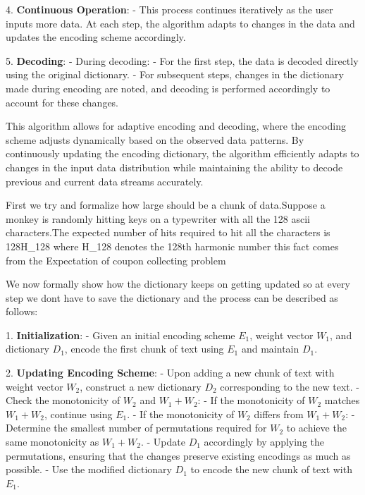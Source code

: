 \documentclass[scrartcl]{article}
\begin{document}
   4. \textbf{Continuous Operation}:
      - This process continues iteratively as the user inputs more data. At each step, the algorithm adapts to changes in the data and updates the encoding scheme accordingly.
   
   5. \textbf{Decoding}:
      - During decoding:
        - For the first step, the data is decoded directly using the original dictionary.
        - For subsequent steps, changes in the dictionary made during encoding are noted, and decoding is performed accordingly to account for these changes.
   
   This algorithm allows for adaptive encoding and decoding, where the encoding scheme adjusts dynamically based on the observed data patterns. By continuously updating the encoding dictionary, the algorithm efficiently adapts to changes in the input data distribution while maintaining the ability to decode previous and current data streams accurately.
   
   First we try and formalize how large should be a chunk of data.Suppose a monkey is randomly hitting keys on a typewriter with all the 128 ascii characters.The expected number of hits required to hit all the characters is 128H_{128} where H_{128} denotes the 128th harmonic number this fact comes from the Expectation of coupon collecting problem
   
   We now formally show how the dictionary keeps on getting updated so at every step we dont have to save the dictionary and the process can be described as follows:
   
   1. \textbf{Initialization}:
      - Given an initial encoding scheme \( E_1 \), weight vector \( W_1 \), and dictionary \( D_1 \), encode the first chunk of text using \( E_1 \) and maintain \( D_1 \).
   
   2. \textbf{Updating Encoding Scheme}:
      - Upon adding a new chunk of text with weight vector \( W_2 \), construct a new dictionary \( D_2 \) corresponding to the new text.
      - Check the monotonicity of \( W_2 \) and \( W_1 + W_2 \):
        - If the monotonicity of \( W_2 \) matches \( W_1 + W_2 \), continue using \( E_1 \).
        - If the monotonicity of \( W_2 \) differs from \( W_1 + W_2 \):
          - Determine the smallest number of permutations required for \( W_2 \) to achieve the same monotonicity as \( W_1 + W_2 \).
          - Update \( D_1 \) accordingly by applying the permutations, ensuring that the changes preserve existing encodings as much as possible.
          - Use the modified dictionary \( D_1 \) to encode the new chunk of text with \( E_1 \).
   
\end{document}

